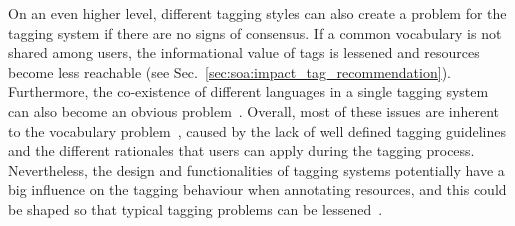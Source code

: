 On an even higher level, different tagging styles can also create a problem for the tagging system if there are no signs of consensus.
If a common vocabulary is not shared among users, the informational value of tags is lessened and resources become less reachable (see Sec.~\ref{sec:soa:impact_tag_recommendation}). Furthermore, the co-existence of different languages in a single tagging system can also become an obvious problem~\citep{halpin2006}.
Overall, most of these issues are inherent to the vocabulary problem~\citep{Furnas1987}, caused by the lack of well defined tagging guidelines and the different rationales that users can apply during the tagging process. Nevertheless, the design and functionalities of tagging systems potentially have a big influence on the tagging behaviour when annotating resources, and this could be shaped so that typical tagging problems can be lessened~\citep{Wang2012}.



